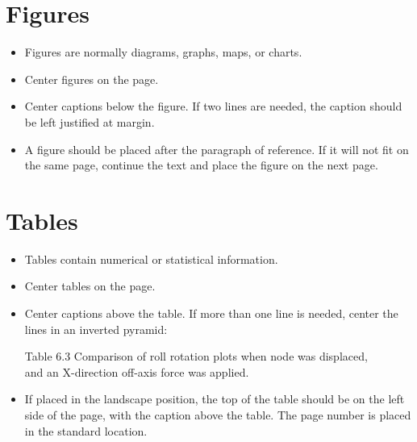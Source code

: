 \section{Figures}
\begin{itemize}
\item	Figures are normally diagrams, graphs, maps, or charts.
\item	Center figures on the page.
\item	Center captions below the figure. If two lines are needed, the caption should be left justified at margin.
\item	A figure should be placed after the paragraph of reference.  If it will not fit on the same page, continue the text and place the figure on the next page.
\end{itemize}

\section{Tables}
\begin{itemize}
\item	Tables contain numerical or statistical information.
\item	Center tables on the page.
\item	Center captions above the table.  If more than one line is needed, center the lines in an inverted pyramid:                                                          
\begin{singlespace}
\begin{center}Table 6.3 Comparison of roll rotation plots when node was displaced,\\
 and an X-direction off-axis force was applied.\end{center}
\end{singlespace}
\item	If placed in the landscape position, the top of the table should be on the left side of the page, with the caption above the table.  The page number is placed in the standard location.
\end{itemize}